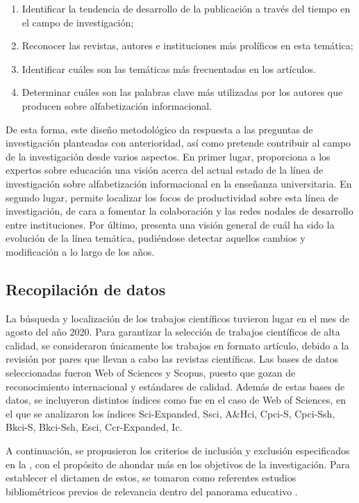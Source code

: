 \documentclass{textolivre}
\begin{document}
\begin{enumerate}[label={\alph*}]
    \item Identificar la tendencia de desarrollo de la publicación a través del tiempo en el campo de investigación;
    \item Reconocer las revistas, autores e instituciones más prolíficos en esta temática;
    \item Identificar cuáles son las temáticas más frecuentadas en los artículos.
    \item Determinar cuáles son las palabras clave más utilizadas por los autores que producen sobre alfabetización informacional.
\end{enumerate}

De esta forma, este diseño metodológico da respuesta a las preguntas de investigación planteadas con anterioridad, así como pretende contribuir al campo de la investigación desde varios aspectos. En primer lugar, proporciona a los expertos sobre educación una visión acerca del actual estado de la línea de investigación sobre alfabetización informacional en la enseñanza universitaria. En segundo lugar, permite localizar los focos de productividad sobre esta línea de investigación, de cara a fomentar la colaboración y las redes nodales de desarrollo entre instituciones. Por último, presenta una visión general de cuál ha sido la evolución de la línea temática, pudiéndose detectar aquellos cambios y modificación a lo largo de los años.

\subsection{Recopilación de datos}
La búsqueda y localización de los trabajos científicos tuvieron lugar en el mes de agosto del año 2020. Para garantizar la selección de trabajos científicos de alta calidad, se consideraron únicamente los trabajos en formato artículo, debido a la revisión por pares que llevan a cabo las revistas científicas. Las bases de datos seleccionadas fueron Web of Sciences y Scopus, puesto que gozan de reconocimiento internacional y estándares de calidad. Además de estas bases de datos, se incluyeron distintos índices como fue en el caso de Web of Sciences, en el que se analizaron los índices Sci-Expanded, Ssci, A\&Hci, Cpci-S, Cpci-Ssh, Bkci-S, Bkci-Ssh, Esci, Ccr-Expanded, Ic.

A continuación, se propusieron los criterios de inclusión y exclusión especificados en la , con el propósito de ahondar más en los objetivos de la investigación. Para establecer el dictamen de estos, se tomaron como referentes estudios bibliométricos previos de relevancia dentro del panorama educativo \cite{moreno-guerrero2020, hinojo-lucena2019}. %
\end{document}
